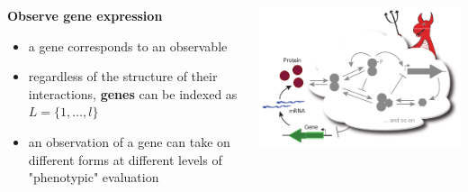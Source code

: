 \begin{frame}
\begin{columns}[c]
\begin{column}{0.5\textwidth}
\begin{block}{\textbf{Observe gene expression}}
\begin{itemize}
\item a gene corresponds to an observable
\item regardless of the structure of their interactions, \textbf{genes} can be indexed as $L = \{1, \ldots, l \}$
\item an observation of a gene can take on different forms at different levels of "phenotypic" evaluation
\end{itemize}
\end{block}
\end{column}
\begin{column}{0.5\textwidth}
\begin{center}
\includegraphics[width=1.0\textwidth]{fig/geneexpressiondemon.pdf}
\cite{Lestas2010}
\end{center}
\end{column}
\end{columns}
\end{frame}
